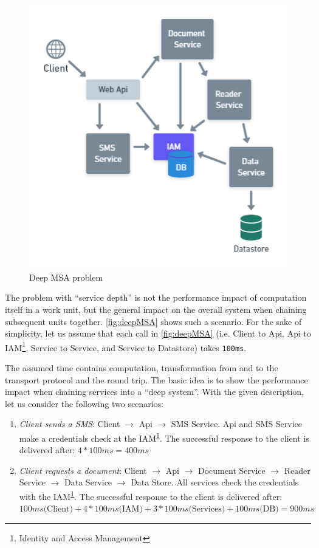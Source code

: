 \begin{figure}[ht]
    \centering
    \includegraphics[width=\columnwidth]{images/service_depth.png}
    \caption{Deep MSA problem}
    \label{fig:deepMSA}
\end{figure}

The problem with ``service depth'' is not the performance
impact of computation itself in a work unit, but the general impact
on the overall system when chaining subsequent units together.
\autoref{fig:deepMSA} shows such a scenario. For the sake of
simplicity, let us assume that each call in \autoref{fig:deepMSA}
(i.e. Client to Api, Api to IAM\footnote{\label{fn:IAM}Identity and Access Management},
Service to Service, and Service to Datastore) takes \texttt{100ms}.

The assumed time contains computation, transformation from and to
the transport protocol and the round trip.
The basic idea is to show the performance impact when chaining services
into a ``deep system''.
With the given description, let us consider the following two scenarios:

\begin{enumerate}
    \item \textit{Client sends a SMS}:
    Client $\rightarrow$ Api $\rightarrow$ SMS Service. Api and SMS Service make
    a credentials check at the IAM\textsuperscript{\ref{fn:IAM}}.
    The successful response to the client
    is delivered after: $4 * 100ms = 400ms$
    \item \textit{Client requests a document}:
    Client $\rightarrow$ Api $\rightarrow$ Document Service $\rightarrow$
    Reader Service $\rightarrow$ Data Service $\rightarrow$ Data Store.
    All services check the credentials with the IAM\textsuperscript{\ref{fn:IAM}}.
    The successful response to the client
    is delivered after: $100ms \text{(Client)} + 4*100ms \text{(IAM)}
    + 3*100ms \text{(Services)} + 100ms \text{(DB)} = 900ms$
\end{enumerate}

